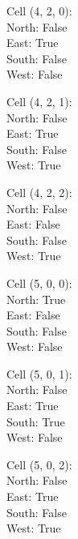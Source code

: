 \documentclass{article}
\begin{document}
\begin{multicols*}{3}
Cell (4, 2, 0):\\
\-\hspace{2cm}North: False\\
\-\hspace{2cm}East: True\\
\-\hspace{2cm}South: False\\
\-\hspace{2cm}West: False

Cell (4, 2, 1):\\
\-\hspace{2cm}North: False\\
\-\hspace{2cm}East: True\\
\-\hspace{2cm}South: False\\
\-\hspace{2cm}West: True

Cell (4, 2, 2):\\
\-\hspace{2cm}North: False\\
\-\hspace{2cm}East: False\\
\-\hspace{2cm}South: False\\
\-\hspace{2cm}West: True

Cell (5, 0, 0):\\
\-\hspace{2cm}North: True\\
\-\hspace{2cm}East: False\\
\-\hspace{2cm}South: False\\
\-\hspace{2cm}West: False

Cell (5, 0, 1):\\
\-\hspace{2cm}North: False\\
\-\hspace{2cm}East: True\\
\-\hspace{2cm}South: True\\
\-\hspace{2cm}West: False

Cell (5, 0, 2):\\
\-\hspace{2cm}North: False\\
\-\hspace{2cm}East: True\\
\-\hspace{2cm}South: False\\
\-\hspace{2cm}West: True


\end{multicols*}
\end{document}
